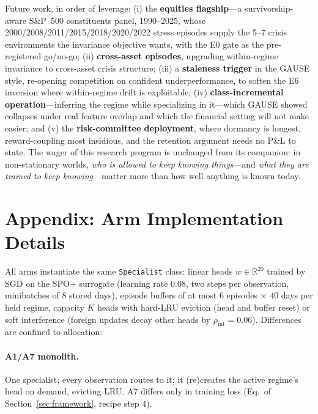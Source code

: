 \documentclass[10pt]{article}
\begin{document}
Future work, in order of leverage: (i) the \textbf{equities flagship}---a
survivorship-aware S\&P~500 constituents panel, 1990--2025, whose
2000/2008/2011/2015/2018/2020/2022 stress episodes supply the 5--7 crisis
environments the invariance objective wants, with the E0 gate as the
pre-registered go/no-go; (ii) \textbf{cross-asset episodes}, upgrading
within-regime invariance to cross-asset crisis structure; (iii) a
\textbf{staleness trigger} in the GAUSE style, re-opening competition on
confident underperformance, to soften the E6 inversion where
within-regime drift is exploitable; (iv) \textbf{class-incremental
operation}---inferring the regime while specializing in it---which GAUSE
showed collapses under real feature overlap and which the financial
setting will not make easier; and (v) the \textbf{risk-committee
deployment}, where dormancy is longest, reward-coupling most insidious,
and the retention argument needs no P\&L to state. The wager of this
research program is unchanged from its companion: in non-stationary
worlds, \emph{who is allowed to keep knowing things}---and \emph{what
they are trained to keep knowing}---matter more than how well anything is
known today.

\appendix

\section{Appendix: Arm Implementation Details}
\label{app:arms}

All arms instantiate the same \texttt{Specialist} class: linear heads
$w \in \mathbb{R}^{20}$ trained by SGD on the SPO+ surrogate (learning
rate $0.08$, two steps per observation, minibatches of $8$ stored days),
episode buffers of at most $6$ episodes $\times$ $40$ days per held
regime, capacity $K$ heads with hard-LRU eviction (head and buffer reset)
or soft interference (foreign updates decay other heads by
$\rho_{\mathrm{int}} = 0.06$). Differences are confined to allocation:

\paragraph{A1/A7 monolith.} One specialist; every observation routes to
it; it (re)creates the active regime's head on demand, evicting LRU.
A7 differs only in training loss (Eq.\ of Section~\ref{sec:framework},
recipe step 4).
\end{document}
